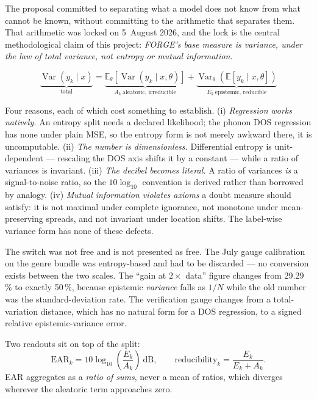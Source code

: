 \documentclass[11pt]{article}
\begin{document}

The proposal committed to separating what a model does not know from what
cannot be known, without committing to the arithmetic that separates them.
That arithmetic was locked on 5~August 2026, and the lock is the central
methodological claim of this project: \emph{FORGE's base measure is variance,
under the law of total variance, not entropy or mutual information.}

\[
  \underbrace{\operatorname{Var}(y_k \mid x)}_{\text{total}}
  = \underbrace{\mathbb{E}_{\theta}\!\left[\operatorname{Var}(y_k \mid x,\theta)\right]}_{A_k \ \text{aleatoric, irreducible}}
  + \underbrace{\operatorname{Var}_{\theta}\!\left(\mathbb{E}[y_k \mid x,\theta]\right)}_{E_k \ \text{epistemic, reducible}}
\]

Four reasons, each of which cost something to establish. (i) \emph{Regression
works natively.} An entropy split needs a declared likelihood; the phonon DOS
regression has none under plain MSE, so the entropy form is not merely awkward
there, it is uncomputable. (ii) \emph{The number is dimensionless.}
Differential entropy is unit-dependent --- rescaling the DOS axis shifts it by
a constant --- while a ratio of variances is invariant. (iii) \emph{The decibel
becomes literal.} A ratio of variances \emph{is} a signal-to-noise ratio, so
the $10\log_{10}$ convention is derived rather than borrowed by analogy.
(iv) \emph{Mutual information violates axioms} a doubt measure should satisfy:
it is not maximal under complete ignorance, not monotone under mean-preserving
spreads, and not invariant under location shifts. The label-wise variance form has
none of these defects.

The switch was not free and is not presented as free. The July gauge
calibration on the genre bundle was entropy-based and had to be discarded ---
no conversion exists between the two scales. The ``gain at $2\times$ data''
figure changes from 29.29\,\% to exactly 50\,\%, because epistemic
\emph{variance} falls as $1/N$ while the old number was the standard-deviation
rate. The verification gauge changes from a total-variation distance, which
has no natural form for a DOS regression, to a signed relative
epistemic-variance error.

Two readouts sit on top of the split:
\[
  \mathrm{EAR}_k = 10\log_{10}\!\left(\frac{E_k}{A_k}\right)\ \text{dB},
  \qquad
  \mathrm{reducibility}_k = \frac{E_k}{E_k + A_k}.
\]
EAR aggregates as a \emph{ratio of sums}, never a mean of ratios, which
diverges wherever the aleatoric term approaches zero.
\end{document}
